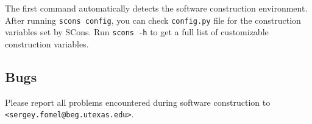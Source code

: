 The first command automatically detects the software construction environment.
After running \texttt{scons config}, you can check \texttt{config.py} file for
the construction variables set by SCons. Run \texttt{scons -h} to get a full
list of customizable construction variables.

\subsection{Bugs}

Please report all problems encountered during software construction to \\
\texttt{<sergey.fomel@beg.utexas.edu>}.

%

